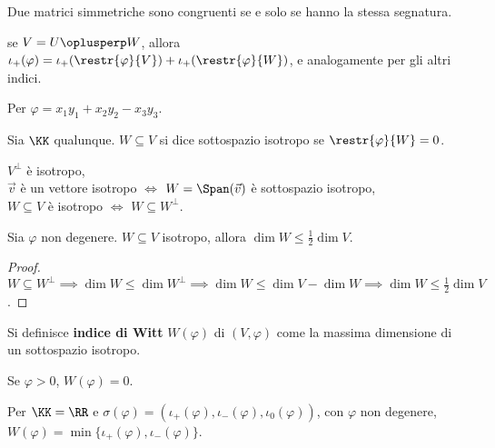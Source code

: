 \documentclass[11pt]{article}
\begin{document}
	\begin{corollary}
		Due matrici simmetriche sono congruenti se e solo se hanno
		la stessa segnatura.
	\end{corollary}

	\begin{remark}\nl
		\li se $V = U \oplusperp W$, allora $\iota_+(\varphi) = \iota_+(\restr{\varphi}{V}) + \iota_+(\restr{\varphi}{W})$, e
		analogamente per gli altri indici.
	\end{remark}

	\begin{example}
		Per $\varphi = x_1 y_1 + x_2 y_2 - x_3 y_3$. %
	\end{example}

	\begin{definition}
		Sia $\KK$ qualunque. $W \subseteq V$ si dice sottospazio isotropo
		se $\restr{\varphi}{W} = 0$.
	\end{definition}

	\begin{remark}\nl
		\li $V^\perp$ è isotropo, \\
		\li $\vec{v}$ è un vettore isotropo $\iff$ $W = \Span(\vec v)$ è sottospazio isotropo, \\
		\li $W \subseteq V$ è isotropo $\iff$ $W \subseteq W^\perp$.
	\end{remark}

	\begin{proposition}
		Sia $\varphi$ non degenere. $W \subseteq V$ isotropo, allora
		$\dim W \leq \frac{1}{2} \dim V$.
	\end{proposition}

	\begin{proof}
		$W \subseteq W^\perp \implies \dim W \leq \dim W^\perp \implies
		\dim W \leq \dim V - \dim W \implies \dim W \leq \frac{1}{2} \dim V$.
	\end{proof}

	\begin{definition}
		Si definisce \textbf{indice di Witt} $W(\varphi)$ di $(V, \varphi)$
		come la massima dimensione di un sottospazio isotropo. 
	\end{definition}

	\begin{remark}\nl
		\li Se $\varphi > 0$, $W(\varphi) = 0$.
	\end{remark}

	\begin{proposition}
		Per $\KK = \RR$ e $\sigma(\varphi) = (\iota_+(\varphi), \iota_-(\varphi), \iota_0(\varphi))$, con $\varphi$ non degenere,
		$W(\varphi) = \min\{\iota_+(\varphi), \iota_-(\varphi)\}$.
	\end{proposition}
\end{document}
